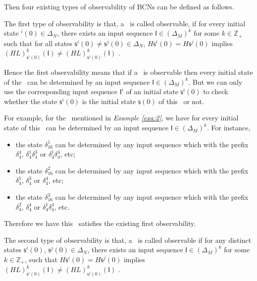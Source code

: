 Then four existing types of observability of BCNs can be defined as follows.
\begin{definition} 
The first type of observability is that, a \BCN\ is called observable, if for every initial state \State$^{i}(0)$$\in \Delta_N$, there exists an input sequence $\mathsf{I}\in(\Delta_M)^k$ for some $k\in \mathbb{Z}_+$ such that for all states $\mathsf{s}^{i}(0)\neq \mathsf{s}^{j}(0)\in \Delta_N$, $H\mathsf{s}^{i}(0)=H\mathsf{s}^{j}(0)$ implies $(HL)^k_{\mathsf{s}^{i}(0)}(\mathsf{I})\neq (HL)^k_{{\mathsf{s}^{j}(0)}}(\mathsf{I})$ \cite{cheng2009controllability}.
\end{definition}

Hence the first observability means that if a \BCN\ is observable then every initial state of the \BCN\ can be determined by an input sequence $\mathsf{I}\in(\Delta_M)^k$. But we can only use the corresponding input sequence $\mathsf{I}^i$ of an initial state $\mathsf{s}^{i}(0)$ to check whether the state $\mathsf{s}^{i}(0)$ is the initial state $\mathsf{s}(0)$ of this \BCN\ or not.
\begin{example}
For example, for the \BCN\ mentioned in {\em Example \ref{exa:2}}, we have for every initial state of this \BCN\ can be determined by an input sequence $\mathsf{I}\in(\Delta_M)^k$.  For instance,
\begin{itemize}
  \item the state $\delta_{16}^1$ can be determined by any input sequence which with the prefix $\delta_{4}^4$, $\delta_{4}^1 \delta_{4}^3$ or $\delta_{4}^1 \delta_{4}^4$, etc;
  \item the state $\delta_{16}^2$ can be determined by any input sequence which with the prefix $\delta_{4}^1$, $\delta_{4}^3$ or $\delta_{4}^4$, etc;
  \item the state $\delta_{16}^3$ can be determined by any input sequence which with the prefix $\delta_{4}^2$, $\delta_{4}^4$ or $\delta_{4}^1 \delta_{4}^4$, etc.
\end{itemize} 

Therefore we have this \BCN\ satisfies the existing first observability.
\end{example}   

\begin{definition}
	The second type of observability is that, a \BCN\ is called observable if for any distinct states $\mathsf{s}^{i}(0)$, $\mathsf{s}^{j}(0) \in \Delta_N$, there exists an input sequence $\mathsf{I}\in(\Delta_M)^k$ for some $k\in \mathbb{Z}_+$, such that $H\mathsf{s}^{i}(0)=H\mathsf{s}^{j}(0)$ implies $(HL)^k_{\mathsf{s}^{i}(0)}(\mathsf{I})\neq (HL)^k_{\mathsf{s}^{j}(0)}(\mathsf{I})$ \cite{Zhao2010Input}.
\end{definition}


